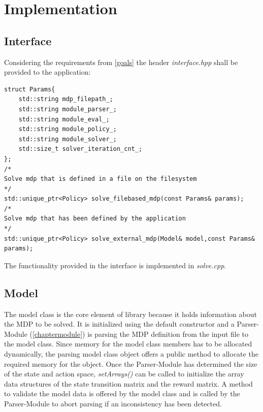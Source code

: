 \chapter{Implementation}

\begin{minipage}{12cm}

\end{minipage}
\section{Interface}

Considering the requirements from \autoref{goals} the header \emph{interface.hpp} shall be provided to the application:

\begin{lstlisting}
struct Params{
	std::string mdp_filepath_;
	std::string module_parser_;
	std::string module_eval_;
	std::string module_policy_;
	std::string module_solver_;
	std::size_t solver_iteration_cnt_;
};
/*
Solve mdp that is defined in a file on the filesystem
*/
std::unique_ptr<Policy> solve_filebased_mdp(const Params& params);
/*
Solve mdp that has been defined by the application
*/
std::unique_ptr<Policy> solve_external_mdp(Model& model,const Params& params);

\end{lstlisting}

The functionality provided in the interface is implemented in \emph{solve.cpp}. 

\section{Model}

The model class is the core element of library because it holds information about the MDP to be solved. It is initialized using the default constructor and a Parser-Module (\autoref{chaptermodule}) is parsing the MDP definition from the input file to the model class. Since memory for the model class members has to be allocated dynamically, the parsing model class object offers a public method to allocate the required memory for the object. Once the Parser-Module has determined the size of the state and action space, \emph{setArrays()} can be called to initialize the array data structures of the state transition matrix and the reward matrix. A method to validate the model data is offered by the model class and is called by the Parser-Module to abort parsing if an inconsistency has been detected. 

